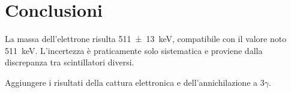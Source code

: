 \section{Conclusioni}

La massa dell'elettrone risulta \SI{511(13)}{keV},
compatibile con il valore noto \SI{511}{keV}.
L'incertezza è praticamente solo sistematica e proviene dalla discrepanza tra scintillatori diversi.

Aggiungere i risultati della cattura elettronica e dell'annichilazione a 3$\gamma$.
